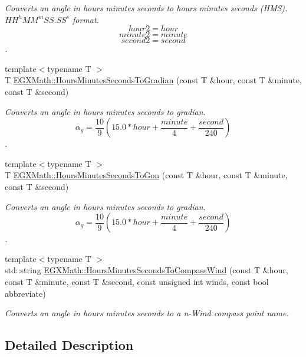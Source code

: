 \begin{DoxyCompactItemize}
\begin{DoxyCompactList}\small\item\em Converts an angle in hours minutes seconds to hours minutes seconds (H\+MS). ${HH}^h{MM}^m{SS.SS}^s$ format. \[hour2 = hour \] \[minute2 = minute\] \[second2 = second\]. \end{DoxyCompactList}\item 
{\footnotesize template$<$typename T $>$ }\\T \mbox{\hyperlink{group___e_g_x_math-_angle_conversions-_hours_minutes_seconds_ga1731e750f3e5561313ee9d22adff747e}{E\+G\+X\+Math\+::\+Hours\+Minutes\+Seconds\+To\+Gradian}} (const T \&hour, const T \&minute, const T \&second)
\begin{DoxyCompactList}\small\item\em Converts an angle in hours minutes seconds to gradian. \[\alpha_{g}=\frac{10}{9}(15.0 * hour + \frac{minute}{4} + \frac{second}{240})\]. \end{DoxyCompactList}\item 
{\footnotesize template$<$typename T $>$ }\\T \mbox{\hyperlink{group___e_g_x_math-_angle_conversions-_hours_minutes_seconds_ga356f1e89c3ea35a9d46967644d4ddfd3}{E\+G\+X\+Math\+::\+Hours\+Minutes\+Seconds\+To\+Gon}} (const T \&hour, const T \&minute, const T \&second)
\begin{DoxyCompactList}\small\item\em Converts an angle in hours minutes seconds to gradian. \[\alpha_{g}=\frac{10}{9}(15.0 * hour + \frac{minute}{4} + \frac{second}{240})\]. \end{DoxyCompactList}\item 
{\footnotesize template$<$typename T $>$ }\\std\+::string \mbox{\hyperlink{group___e_g_x_math-_angle_conversions-_hours_minutes_seconds_gacb8fc46aacbc82db6852dfc9c42c77df}{E\+G\+X\+Math\+::\+Hours\+Minutes\+Seconds\+To\+Compass\+Wind}} (const T \&hour, const T \&minute, const T \&second, const unsigned int winds, const bool abbreviate)
\begin{DoxyCompactList}\small\item\em Converts an angle in hours minutes seconds to a n-\/\+Wind compass point name. \end{DoxyCompactList}\end{DoxyCompactItemize}


\subsection{Detailed Description}


